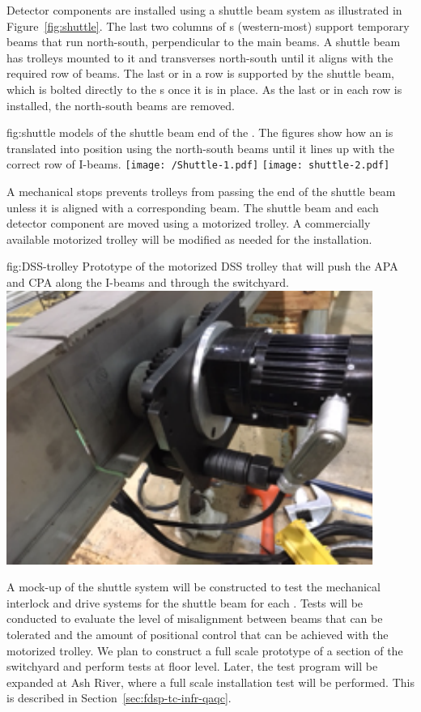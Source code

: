 Detector components are installed using a shuttle beam system as
illustrated in Figure~\ref{fig:shuttle}.  
The last two columns of \fdth{}s (western-most) support temporary beams that run
north-south, perpendicular to the main  beams.  
A shuttle beam has trolleys mounted to it and transverses 
north-south until it aligns with the required row of  beams.  
The last  or  in a row is supported by the shuttle beam, which is bolted directly to the \fdth{}s once it is in place.  
As the last  or  in each row is installed, the north-south beams are removed.

\begin{dunefigure}{fig:shuttle}
  {\threed models of the shuttle beam end of the . The figures show how an 
is translated into position using the north-south beams until it lines up with the correct
row of I-beams.}
\texttt{[image: /Shuttle-1.pdf]}
 \texttt{[image: shuttle-2.pdf]}
\end{dunefigure}

A mechanical stops  prevents trolleys
from passing the end of the shuttle beam unless it is aligned with a
corresponding  beam.  The shuttle beam and each detector component are
moved using a motorized trolley.  A commercially available motorized
trolley will be modified as needed for the
installation. 




\begin{dunefigure}{fig:DSS-trolley}
  {Prototype of the motorized DSS trolley that will push the APA and CPA along the I-beams and through the switchyard.}
\includegraphics[width=.49\textwidth]{graphics/DSS-trolley.pdf}
\end{dunefigure}



A mock-up of the shuttle system will be constructed to test the
mechanical interlock and drive systems for the shuttle beam
for each .  Tests will be conducted to evaluate the level of
misalignment between beams that can be tolerated and the amount of
positional control that can be achieved with the motorized trolley. We plan to construct a full scale prototype of a section of the  switchyard and perform tests at floor level. Later, the test program will be expanded at Ash River, where a full scale installation test will be performed. This is described in 
Section~\ref{sec:fdsp-tc-infr-qaqc}.
